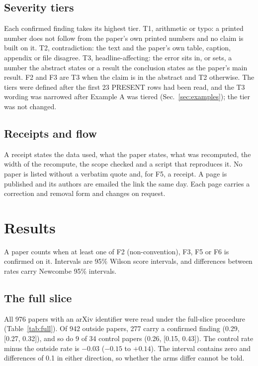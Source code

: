 \documentclass[reprint,amsmath,amssymb,aps,superscriptaddress,nofootinbib]{revtex4-2}
\begin{document}
\subsection{Severity tiers}

Each confirmed finding takes its highest tier. T1, arithmetic or typo: a printed number does not follow from the paper's own printed numbers and no claim is built on it. T2, contradiction: the text and the paper's own table, caption, appendix or file disagree. T3, headline-affecting: the error sits in, or sets, a number the abstract states or a result the conclusion states as the paper's main result. F2 and F3 are T3 when the claim is in the abstract and T2 otherwise. The tiers were defined after the first 23 PRESENT rows had been read, and the T3 wording was narrowed after Example A was tiered (Sec.~\ref{sec:examples}); the tier was not changed.

\subsection{Receipts and flow}

A receipt states the data used, what the paper states, what was recomputed, the width of the recompute, the scope checked and a script that reproduces it. No paper is listed without a verbatim quote and, for F5, a receipt. A page is published and its authors are emailed the link the same day. Each page carries a correction and removal form and changes on request.

\section{Results}

A paper counts when at least one of F2 (non-convention), F3, F5 or F6 is confirmed on it. Intervals are 95\% Wilson score intervals, and differences between rates carry Newcombe 95\% intervals.

\subsection{The full slice}
\label{sec:full}

All 976 papers with an arXiv identifier were read under the full-slice procedure (Table~\ref{tab:full}). Of 942 outside papers, 277 carry a confirmed finding (0.29, [0.27, 0.32]), and so do 9 of 34 control papers (0.26, [0.15, 0.43]). The control rate minus the outside rate is $-0.03$ ($-0.15$ to $+0.14$). The interval contains zero and differences of 0.1 in either direction, so whether the arms differ cannot be told.
\end{document}
